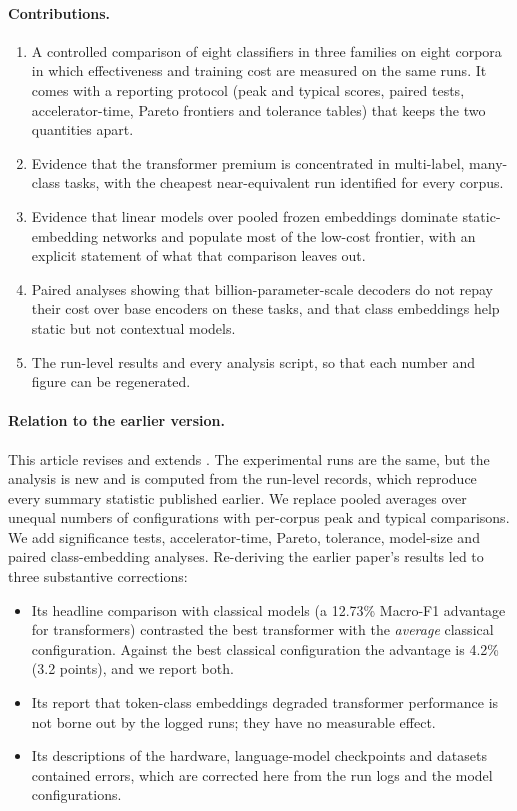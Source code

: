 \documentclass{ijis}
\begin{document}
\paragraph{Contributions.}
\begin{enumerate}
\setlength\itemsep{1pt}
\item[(i)] A controlled comparison of eight classifiers in three families on eight corpora in which effectiveness and training cost are measured on the same runs. It comes with a reporting protocol (peak and typical scores, paired tests, accelerator-time, Pareto frontiers and tolerance tables) that keeps the two quantities apart.
\item[(ii)] Evidence that the transformer premium is concentrated in multi-label, many-class tasks, with the cheapest near-equivalent run identified for every corpus.
\item[(iii)] Evidence that linear models over pooled frozen embeddings dominate static-embedding networks and populate most of the low-cost frontier, with an explicit statement of what that comparison leaves out.
\item[(iv)] Paired analyses showing that billion-parameter-scale decoders do not repay their cost over base encoders on these tasks, and that class embeddings help static but not contextual models.
\item[(v)] The run-level results and every analysis script, so that each number and figure can be regenerated.
\end{enumerate}

\paragraph{Relation to the earlier version.} This article revises and extends \cite{worth2025layercake}. The experimental runs are the same, but the analysis is new and is computed from the run-level records, which reproduce every summary statistic published earlier. We replace pooled averages over unequal numbers of configurations with per-corpus peak and typical comparisons. We add significance tests, accelerator-time, Pareto, tolerance, model-size and paired class-embedding analyses. Re-deriving the earlier paper's results led to three substantive corrections:
\begin{itemize}
\setlength\itemsep{1pt}
\item Its headline comparison with classical models (a 12.73\% Macro-F1 advantage for transformers) contrasted the best transformer with the \emph{average} classical configuration. Against the best classical configuration the advantage is 4.2\% (3.2 points), and we report both.
\item Its report that token-class embeddings degraded transformer performance is not borne out by the logged runs; they have no measurable effect.
\item Its descriptions of the hardware, language-model checkpoints and datasets contained errors, which are corrected here from the run logs and the model configurations.
\end{itemize}
\end{document}
